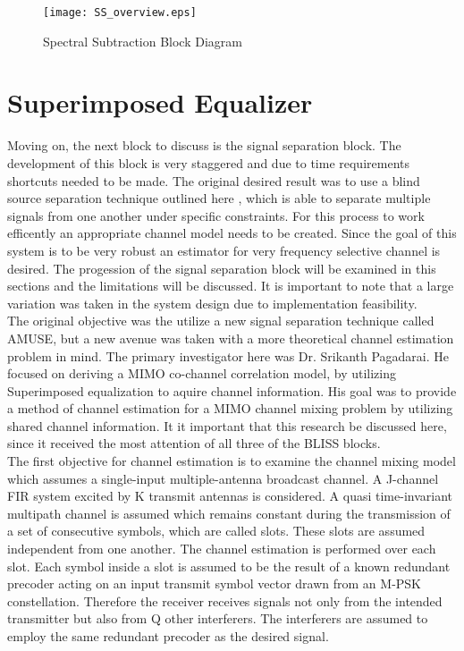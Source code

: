 \begin{figure}[!ht]\label{ss_overview}
\centering
\texttt{[image: SS\_overview.eps]}
\caption{Spectral Subtraction Block Diagram}
\end{figure}


\section{Superimposed Equalizer}

Moving on, the next block to discuss is the signal separation block.  The development of this block is very staggered and due to time requirements shortcuts needed to be made.  The original desired result was to use a blind source separation technique outlined here \cite{AMUSE}, which is able to separate multiple signals from one another under specific constraints.  For this process to work efficently an appropriate channel model needs to be created.  Since the goal of this system is to be very robust an estimator for very frequency selective channel is desired.  The progession of the signal separation block will be examined in this sections and the limitations will be discussed.  It is important to note that a large variation was taken in the system design due to implementation feasibility.\\

The original objective was the utilize a new signal separation technique called AMUSE, but a new avenue was taken with a more theoretical channel estimation problem in mind.  The primary investigator here was Dr. Srikanth Pagadarai.  He focused on deriving a MIMO co-channel correlation model, by utilizing Superimposed equalization to aquire channel information.  His goal was to provide a method of channel estimation for a MIMO channel mixing problem by utilizing shared channel information.  It it important that this research be discussed here, since it received the most attention of all three of the BLISS blocks.\\

The first objective for channel estimation is to examine the channel mixing model which assumes a single-input multiple-antenna broadcast channel.  A J-channel FIR system excited by K transmit antennas is considered. A quasi time-invariant multipath channel is assumed which remains constant during the transmission of a set of consecutive symbols, which are called slots. These slots are assumed independent from one another.  The channel estimation is performed over each slot. Each symbol inside a slot is assumed to be the result of a known redundant precoder acting on an input transmit symbol vector drawn from an M-PSK constellation. Therefore the receiver receives signals not only from the intended transmitter but also from Q other interferers. The interferers are assumed to employ the same redundant precoder as the desired signal\cite{skrkantPHD}.\\

